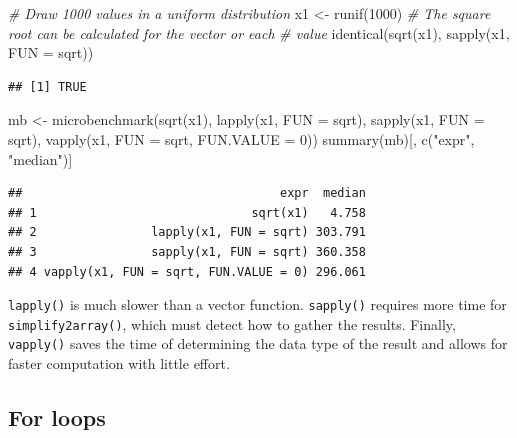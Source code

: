 \documentclass[
  12pt,
  american,
  a4paper,
  extrafontsizes,onecolumn,openright
  ]{memoir}
\newenvironment{Shaded}{\begin{snugshade}}{\end{snugshade}}
\newcommand{\AttributeTok}[1]{\textcolor[rgb]{0.77,0.63,0.00}{#1}}
\newcommand{\CommentTok}[1]{\textcolor[rgb]{0.56,0.35,0.01}{\textit{#1}}}
\newcommand{\DecValTok}[1]{\textcolor[rgb]{0.00,0.00,0.81}{#1}}
\newcommand{\FunctionTok}[1]{\textcolor[rgb]{0.00,0.00,0.00}{#1}}
\newcommand{\NormalTok}[1]{#1}
\newcommand{\OtherTok}[1]{\textcolor[rgb]{0.56,0.35,0.01}{#1}}
\newcommand{\StringTok}[1]{\textcolor[rgb]{0.31,0.60,0.02}{#1}}
\begin{document}
\scriptsize

\begin{Shaded}
\begin{Highlighting}[]
\CommentTok{\# Draw 1000 values in a uniform distribution}
\NormalTok{x1 }\OtherTok{\textless{}{-}} \FunctionTok{runif}\NormalTok{(}\DecValTok{1000}\NormalTok{)}
\CommentTok{\# The square root can be calculated for the vector or each}
\CommentTok{\# value}
\FunctionTok{identical}\NormalTok{(}\FunctionTok{sqrt}\NormalTok{(x1), }\FunctionTok{sapply}\NormalTok{(x1, }\AttributeTok{FUN =}\NormalTok{ sqrt))}
\end{Highlighting}
\end{Shaded}

\begin{verbatim}
## [1] TRUE
\end{verbatim}

\begin{Shaded}
\begin{Highlighting}[]
\NormalTok{mb }\OtherTok{\textless{}{-}} \FunctionTok{microbenchmark}\NormalTok{(}\FunctionTok{sqrt}\NormalTok{(x1), }\FunctionTok{lapply}\NormalTok{(x1, }\AttributeTok{FUN =}\NormalTok{ sqrt), }\FunctionTok{sapply}\NormalTok{(x1,}
    \AttributeTok{FUN =}\NormalTok{ sqrt), }\FunctionTok{vapply}\NormalTok{(x1, }\AttributeTok{FUN =}\NormalTok{ sqrt, }\AttributeTok{FUN.VALUE =} \DecValTok{0}\NormalTok{))}
\FunctionTok{summary}\NormalTok{(mb)[, }\FunctionTok{c}\NormalTok{(}\StringTok{"expr"}\NormalTok{, }\StringTok{"median"}\NormalTok{)]}
\end{Highlighting}
\end{Shaded}

\begin{verbatim}
##                                    expr  median
## 1                              sqrt(x1)   4.758
## 2                lapply(x1, FUN = sqrt) 303.791
## 3                sapply(x1, FUN = sqrt) 360.358
## 4 vapply(x1, FUN = sqrt, FUN.VALUE = 0) 296.061
\end{verbatim}

\normalsize

\texttt{lapply()} is much slower than a vector function.
\texttt{sapply()} requires more time for \texttt{simplify2array()}, which must detect how to gather the results.
Finally, \texttt{vapply()} saves the time of determining the data type of the result and allows for faster computation with little effort.

\hypertarget{for-loops}{%
\subsection{For loops}\label{for-loops}}
\end{document}
